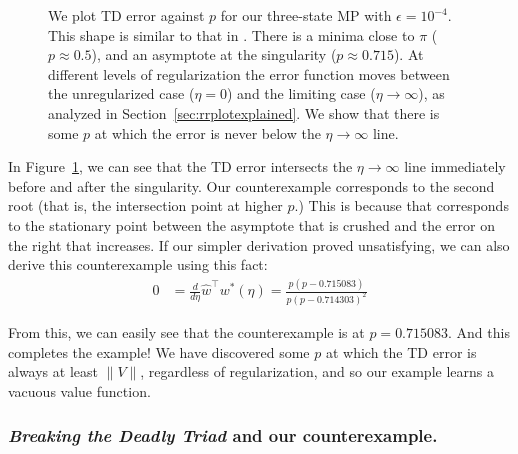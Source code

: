 \begin{figure}
  
  \caption{We plot TD error against $p$ for our three-state MP with $\epsilon=10^{-4}$. This shape is similar to that in \cite{kolter2011fixed}. There is a minima close to $\pi$ ($p\approx 0.5$), and an asymptote at the singularity ($p\approx 0.715$). At different levels of regularization the error function moves between the unregularized case ($\eta=0$) and the limiting case ($\eta\to\infty$), as analyzed in Section~\ref{sec:rrplotexplained}. We show that there is some $p$ at which the error is never below the $\eta\to\infty$ line. }
  \label{fig:fixedpointp}
\end{figure}

In Figure~\ref{fig:fixedpointp}, we can see that the TD error intersects the $\eta\to\infty$ line immediately before and after the singularity. Our counterexample corresponds to the second root (that is, the intersection point at higher $p$.) This is because that corresponds to the stationary point between the asymptote that is crushed and the error on the right that increases. If our simpler derivation proved unsatisfying, we can also derive this counterexample using this fact:
\begin{align}
  0 & = \frac{d}{d \eta} \hat w^\top w^*(\eta)
  = \frac{p(p - 0.715083)}{p(p - 0.714303)^2}
\end{align}

From this, we can easily see that the counterexample is at $p = 0.715083$.
And this completes the example! We have discovered some $p$ at which the TD error is always at least $\|V\|$, regardless of regularization, and so our example learns a vacuous value function.


\subsubsection{\emph{Breaking the Deadly Triad} and our counterexample.}


